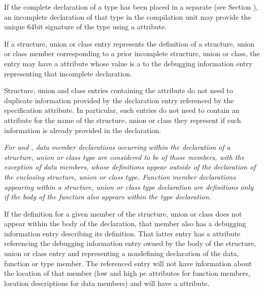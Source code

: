 If the complete declaration of a type has been placed in
\hypertarget{chap:DWATsignaturetypesignature}{}
a separate 
(see Section ), 
an incomplete declaration 
of that type in the compilation unit may provide
the unique 64\dash bit signature of the type using 
a \DWATsignature{}
attribute.

If a structure, union or class entry represents the definition
of a structure, union or class member corresponding to a prior
incomplete structure, union or class, the entry may have a
\DWATspecification{} attribute 
whose value is a  to
the debugging information entry representing that incomplete
declaration.

Structure, union and class entries containing the
\DWATspecification{} attribute 
do not need to duplicate
information provided by the declaration entry referenced by the
specification attribute.  In particular, such entries do not
need to contain an attribute for the name of the structure,
union or class they represent if such information is already
provided in the declaration.

\textit{For  and , 
data 
member declarations occurring within
the declaration of a structure, union or class type are
considered to be  of those members, with
the exception of  data members, whose definitions
appear outside of the declaration of the enclosing structure,
union or class type. Function member declarations appearing
within a structure, union or class type declaration are
definitions only if the body of the function also appears
within the type declaration.}

If the definition for a given member of the structure, union
or class does not appear within the body of the declaration,
that member also has a debugging information entry describing
its definition. That latter entry has a 
\DWATspecification{} attribute 
referencing the debugging information entry
owned by the body of the structure, union or class entry and
representing a non\dash defining declaration of the data, function
or type member. The referenced entry will not have information
about the location of that member (low and high pc attributes
for function members, location descriptions for data members)
and will have a \DWATdeclaration{} attribute.

